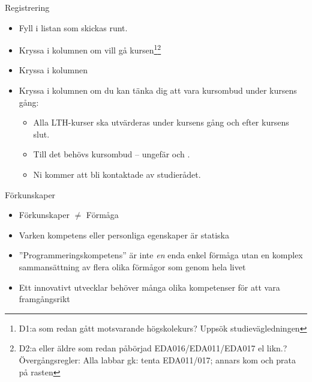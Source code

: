\begin{SlideExtra}{Registrering}
\begin{itemize}
\item Fyll i listan  som skickas runt.

\item Kryssa i kolumnen  om vill gå kursen\footnote{\scriptsize D1:a som redan gått motsvarande högskolekurs? Uppsök studievägledningen}\footnote{\scriptsize D2:a eller äldre som redan påbörjad EDA016/EDA011/EDA017 el likn.? Övergångsregler: Alla labbar gk: tenta EDA011/017; annars kom och prata på rasten}

\item Kryssa i kolumnen 

\item Kryssa i kolumnen  om du kan tänka dig att vara kursombud under kursens gång:
\begin{itemize}
\item Alla LTH-kurser ska utvärderas under kursens gång och efter kursens slut.
\item Till det behövs kursombud -- ungefär  och .
\item Ni kommer att bli kontaktade av studierådet.
\end{itemize}
\end{itemize}
\end{SlideExtra}

\fi


\ifkompendium\else

\begin{SlideExtra}{Förkunskaper}
\begin{itemize}
\item Förkunskaper $\neq$ Förmåga
\item Varken kompetens eller personliga egenskaper är statiska
\item ''Programmeringskompetens'' är inte \textit{en} enda enkel förmåga utan en komplex sammansättning av flera olika förmågor som  genom hela livet
\item Ett innovativt utvecklar behöver många olika kompetenser för att vara framgångsrikt
\end{itemize}
\end{SlideExtra}
\fi

\ifkompendium\else


